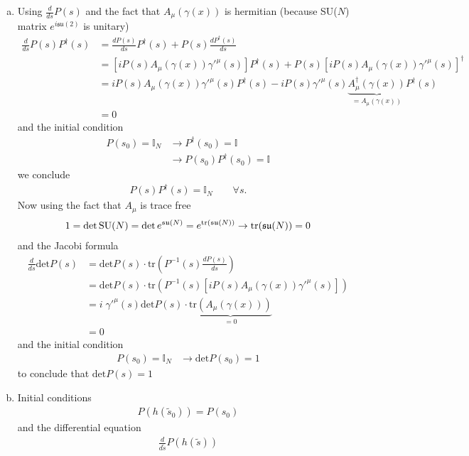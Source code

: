 \documentclass[10pt,a4paper]{article}
\theoremstyle{definition}
\begin{document}
\begin{enumerate}[a.)]
\item Using $\frac{d}{ds}P(s)$ and the fact that $A_\mu(\gamma(x))$ is hermitian (because SU($N$) matrix $e^{i\mathfrak{su}(2)}$ is unitary)
\begin{align}
\frac{d}{ds}P(s)P^\dagger(s)
&=\frac{dP(s)}{ds}P^\dagger(s)+P(s)\frac{dP^\dagger(s)}{ds}\\
&=[iP(s)A_\mu(\gamma(x))\gamma'^\mu(s)]P^\dagger(s)+P(s)[iP(s)A_\mu(\gamma(x))\gamma'^\mu(s)]^\dagger\\
&=iP(s)A_\mu(\gamma(x))\gamma'^\mu(s)P^\dagger(s)-iP(s)\gamma'^\mu(s)\underbrace{A^\dagger_\mu(\gamma(x))}_{=A_\mu(\gamma(x))}P^\dagger(s)\\
&=0
\end{align}
and the initial condition
\begin{align}
P(s_0)=\mathbb{I}_N
&\rightarrow P^\dagger(s_0)=\mathbb{I}\\
&\rightarrow P(s_0)P^\dagger(s_0)=\mathbb{I}
\end{align}
we conclude
\begin{align}
P(s)P^\dagger(s)=\mathbb{I}_N\qquad\forall s.
\end{align}
Now using the fact that $A_\mu$ is trace free
\begin{align}
1=\text{det\,SU}(N)=\text{det\,}e^{\mathfrak{su}(N)}=e^{\text{tr}(\mathfrak{su}(N))}\rightarrow\text{tr}(\mathfrak{su}(N))=0
\end{align}
and the Jacobi formula
\begin{align}
\frac{d}{ds}\text{det}P(s)
&=\text{det}P(s)\cdot\text{tr}\left(P^{-1}(s)\frac{dP(s)}{ds}\right)\\
&=\text{det}P(s)\cdot\text{tr}\left(P^{-1}(s)[iP(s)A_\mu(\gamma(x))\gamma'^\mu(s)]\right)\\
&=i\;\gamma'^\mu(s)\text{det}P(s)\cdot\underbrace{\text{tr}\left(A_\mu(\gamma(x)) \right)}_{=0}\\
&=0
\end{align}
and the initial condition
\begin{align}
P(s_0)=\mathbb{I}_N
&\rightarrow \text{det}P(s_0)=1
\end{align}
to conclude that $\text{det}P(s)=1$
\item Initial conditions
\begin{align}
P(h(\tilde{s}_0))=P(s_0)
\end{align}
and the differential equation
\begin{align}
\frac{d}{d\tilde{s}}P(h(\tilde{s}))

\end{align}
\end{enumerate}
\end{document}
